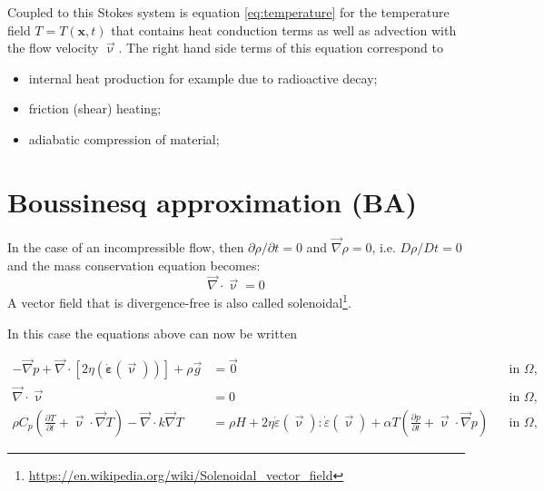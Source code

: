 \documentclass[a4paper]{article}
\begin{document}
Coupled to this Stokes system is equation \eqref{eq:temperature} for the
temperature field $T=T(\mathbf x,t)$ that contains heat conduction terms as
well as advection with the flow velocity $\vec{\upnu}$. The right hand side
terms of this equation correspond to
\begin{itemize}
\item internal heat production for example due to radioactive decay;
\item friction (shear) heating;
\item adiabatic compression of material;
\end{itemize}


\newpage
\section{Boussinesq approximation (BA)}

In the case of an incompressible flow, then $\partial \rho/\partial t=0$ and
${\vec \nabla}\rho=0$, i.e. $D\rho/Dt=0$ and the mass conservation equation becomes:
\[
{\vec \nabla}\cdot{\vec \upnu} = 0
\]
A vector field that is divergence-free is also called
solenoidal\footnote{\url{https://en.wikipedia.org/wiki/Solenoidal_vector_field}}.

In this case the equations above can now be written

\begin{align}
  - \vec\nabla p +  
  \vec\nabla \cdot \left[2\eta \left(\dot{\bm \varepsilon}(\vec \upnu)  \right)
                \right] +  \rho \vec g &= \vec{0}
  &
  & \textrm{in $\Omega$},
  \\
  \vec\nabla \cdot \vec \upnu &= 0
  &
  & \textrm{in $\Omega$},
  \\
  \rho C_p \left(\frac{\partial T}{\partial t} + \vec \upnu\cdot\vec\nabla T\right)
  - \vec\nabla\cdot k\vec\nabla T
  &=
  \rho H
  +
  2\eta \dot\varepsilon(\vec\upnu) : \dot\varepsilon(\vec\upnu) 
  +\alpha T \left( \frac{\partial p}{\partial t} +  \vec \upnu \cdot \vec\nabla p \right)
  && \textrm{in $\Omega$},
\end{align}
\end{document}
